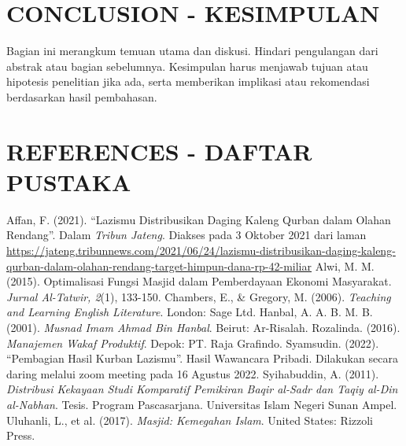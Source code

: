 \documentclass[12pt, a4paper]{article}
\begin{document}
\section*{CONCLUSION - KESIMPULAN}
Bagian ini merangkum temuan utama dan diskusi. Hindari pengulangan dari abstrak atau bagian sebelumnya. Kesimpulan harus menjawab tujuan atau hipotesis penelitian jika ada, serta memberikan implikasi atau rekomendasi berdasarkan hasil pembahasan.

\section*{REFERENCES - DAFTAR PUSTAKA}
\begin{thebibliography}{99} %
 Affan, F. (2021). “Lazismu Distribusikan Daging Kaleng Qurban dalam Olahan Rendang”. Dalam \textit{Tribun Jateng}. Diakses pada 3 Oktober 2021 dari laman \url{https://jateng.tribunnews.com/2021/06/24/lazismu-distribusikan-daging-kaleng-qurban-dalam-olahan-rendang-target-himpun-dana-rp-42-miliar}
 Alwi, M. M. (2015). Optimalisasi Fungsi Masjid dalam Pemberdayaan Ekonomi Masyarakat. \textit{Jurnal Al-Tatwir, 2}(1), 133-150.
 Chambers, E., \& Gregory, M. (2006). \textit{Teaching and Learning English Literature}. London: Sage Ltd.
 Hanbal, A. A. B. M. B. (2001). \textit{Musnad Imam Ahmad Bin Hanbal}. Beirut: Ar-Risalah.
 Rozalinda. (2016). \textit{Manajemen Wakaf Produktif}. Depok: PT. Raja Grafindo.
 Syamsudin. (2022). “Pembagian Hasil Kurban Lazismu”. Hasil Wawancara Pribadi. Dilakukan secara daring melalui zoom meeting pada 16 Agustus 2022.
 Syihabuddin, A. (2011). \textit{Distribusi Kekayaan Studi Komparatif Pemikiran Baqir al-Sadr dan Taqiy al-Din al-Nabhan}. Tesis. Program Pascasarjana. Universitas Islam Negeri Sunan Ampel.
 Uluhanli, L., et al. (2017). \textit{Masjid: Kemegahan Islam}. United States: Rizzoli Press.
\end{thebibliography}
\end{document}
